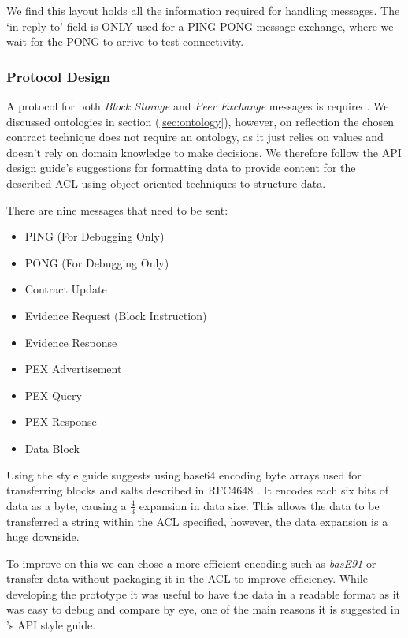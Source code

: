 \documentclass[11pt, a4paper, twocolumn, twoside]{report}
\begin{document}
We find this layout holds all the information required for handling messages. The `in-reply-to' field is ONLY used for a PING-PONG message exchange, where we wait for the PONG to arrive to test connectivity.

\subsubsection{Protocol Design}

A protocol for both \emph{Block Storage} and \emph{Peer Exchange} messages is required. We discussed ontologies in section (\ref{sec:ontology}), however, on reflection the chosen contract technique does not require an ontology, as it just relies on values and doesn't rely on domain knowledge to make decisions. We therefore follow the API design guide's suggestions for formatting data to provide content for the described ACL using object oriented techniques to structure data.

There are nine messages that need to be sent:

\begin{itemize}
 \item PING (For Debugging Only)
 \item PONG (For Debugging Only)
 \item Contract Update
 \item Evidence Request (Block Instruction)
 \item Evidence Response
 \item PEX Advertisement
 \item PEX Query
 \item PEX Response
 \item Data Block
\end{itemize}

Using the style guide suggests using base64 encoding byte arrays used for transferring blocks and salts described in RFC4648 \citep{josefsson2006base16}. It encodes each six bits of data as a byte, causing a $\frac{4}{3}$ expansion in data size. This allows the data to be transferred a string within the ACL specified, however, the data expansion is a huge downside.

To improve on this we can chose a more efficient encoding such as \emph{basE91} \citep{joachim2015base91} or transfer data without packaging it in the ACL to improve efficiency. While developing the prototype it was useful to have the data in a readable format as it was easy to debug and compare by eye, one of the main reasons it is suggested in \cite{google2017api}'s API style guide.
\end{document}
